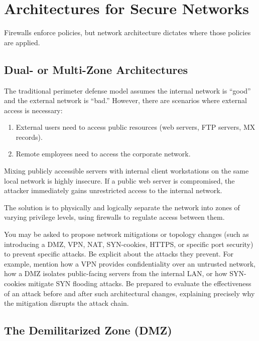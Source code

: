 \section{Architectures for Secure Networks}

Firewalls enforce policies, but network architecture dictates where those policies are applied.

\subsection{Dual- or Multi-Zone Architectures}

The traditional perimeter defense model assumes the internal network is ``good'' and the external network is ``bad.'' However, there are scenarios where external access is necessary:
\begin{enumerate}
    \item External users need to access public resources (web servers, FTP servers, MX records).
    \item Remote employees need to access the corporate network.
\end{enumerate}

Mixing publicly accessible servers with internal client workstations on the same local network is highly insecure. If a public web server is compromised, the attacker immediately gains unrestricted access to the internal network.

The solution is to physically and logically separate the network into zones of varying privilege levels, using firewalls to regulate access between them.

\begin{tcolorbox}[colback=blue!5!white,colframe=blue!75!black,title=Exam Insight]
You may be asked to propose network mitigations or topology changes (such as introducing a DMZ, VPN, NAT, SYN-cookies, HTTPS, or specific port security) to prevent specific attacks. Be explicit about the attacks they prevent. For example, mention how a VPN provides confidentiality over an untrusted network, how a DMZ isolates public-facing servers from the internal LAN, or how SYN-cookies mitigate SYN flooding attacks. Be prepared to evaluate the effectiveness of an attack before and after such architectural changes, explaining precisely why the mitigation disrupts the attack chain.
\end{tcolorbox}

\subsection{The Demilitarized Zone (DMZ)}

